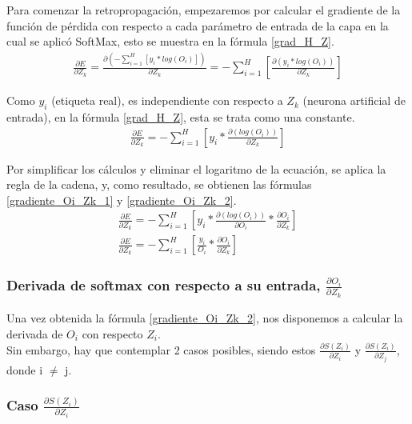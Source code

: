 Para comenzar la retropropagación, empezaremos por calcular el gradiente de la función de pérdida con respecto a cada parámetro de entrada de la capa en la cual se aplicó SoftMax, esto se muestra en la fórmula \ref{grad_H_Z}.
\begin{gather}
	\frac{\partial E}{\partial Z_k} = \frac{\partial(- \sum_{i=1}^{H}  [y_i * log(O_i)])}{\partial Z_k} = - \sum_{i=1}^{H}  [\frac{\partial(y_i * log(O_i))}{\partial Z_k}] 
	\label{grad_H_Z}
\end{gather}

Como $y_i$ (etiqueta real), es independiente con respecto a $Z_k$ (neurona artificial de entrada), en la fórmula \ref{grad_H_Z}, esta se trata como una constante. \\
\begin{gather}
	\frac{\partial E}{\partial Z_k} = - \sum_{i=1}^{H}  [y_i * \frac{\partial(log(O_i))}{\partial Z_k}] 
	\label{grad_O_K}
\end{gather}

Por simplificar los cálculos y eliminar el logaritmo de la ecuación, se aplica la regla de la cadena, y, como resultado, se obtienen las fórmulas \ref{gradiente_Oi_Zk_1} y \ref{gradiente_Oi_Zk_2}.
\begin{gather}	
	\frac{\partial E}{\partial Z_k} = - \sum_{i=1}^{H}  [y_i * \frac{\partial(log(O_i))}{\partial O_i} * \frac{\partial O_i}{\partial Z_k}]
	\label{gradiente_Oi_Zk_1} \\
	\frac{\partial E}{\partial Z_k} = - \sum_{i=1}^{H}  [\frac{y_i}{O_i} * \frac{\partial O_i}{\partial Z_k}] 
	\label{gradiente_Oi_Zk_2}
\end{gather}


\subsubsection{Derivada de softmax con respecto a su entrada, $\frac{\partial O_i}{\partial Z_k}$}

Una vez obtenida la fórmula \ref{gradiente_Oi_Zk_2}, nos disponemos a calcular la derivada de $O_i$ con respecto $Z_i$. \\
Sin embargo, hay que contemplar 2 casos posibles, siendo estos $\frac{\partial S(Z_i)}{\partial Z_i}$ y $\frac{\partial S(Z_i)}{\partial Z_j}$, donde i $\neq$ j. \\

\subsubsection{Caso $\frac{\partial S(Z_i)}{\partial Z_i}$}

